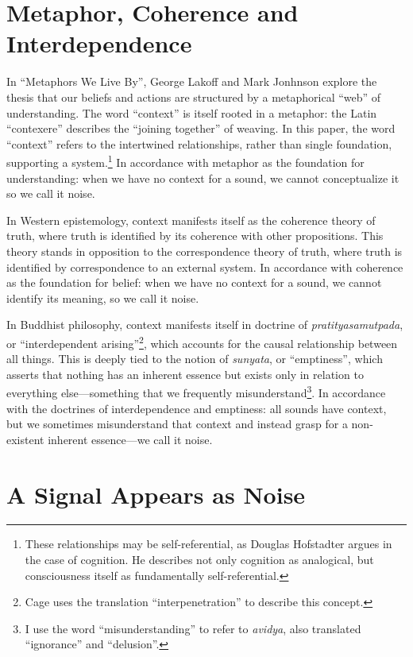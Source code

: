 \documentclass{thesis}
\begin{document}
\section{Metaphor, Coherence and Interdependence}

In ``Metaphors We Live By'', George Lakoff and Mark Jonhnson explore the thesis that our beliefs and actions are structured by a metaphorical ``web'' of understanding. The word ``context'' is itself rooted in a metaphor: the Latin ``contexere'' describes the ``joining together'' of weaving.\cite{douglas_harper_context_2010} In this paper, the word ``context'' refers to the intertwined relationships, rather than single foundation, supporting a system.\footnote{These relationships may be self-referential, as Douglas Hofstadter argues in the case of cognition.\cite{Hofstadter01} He describes not only cognition as analogical, but consciousness itself as fundamentally self-referential\cite{Hofstadter07}.} In accordance with metaphor as the foundation for understanding: when we have no context for a sound, we cannot conceptualize it so we call it noise.

In Western epistemology, context manifests itself as the coherence theory of truth\cite{Blackburn07}\cite{young_coherence_????}, where truth is identified by its coherence with other propositions. This theory stands in opposition to the correspondence\cite{david_correspondence_????} theory of truth, where truth is identified by correspondence to an external system. In accordance with coherence as the foundation for belief: when we have no context for a sound, we cannot identify its meaning, so we call it noise.

In Buddhist philosophy, context manifests itself in doctrine of \emph{pratityasamutpada}, or ``interdependent arising''\footnote{Cage uses the translation ``interpenetration'' to describe this concept.}, which accounts for the causal relationship between all things.\cite{Koller01} This is deeply tied to the notion of \emph{sunyata}, or ``emptiness'', which asserts that nothing has an inherent essence but exists only in relation to everything else---something that we frequently misunderstand\footnote{I use the word ``misunderstanding'' to refer to \emph{avidya}, also translated ``ignorance'' and ``delusion''.}. In accordance with the doctrines of interdependence and emptiness: all sounds have context, but we sometimes misunderstand that context and instead grasp for a non-existent inherent essence---we call it noise.

\section{A Signal Appears as Noise}
\end{document}
